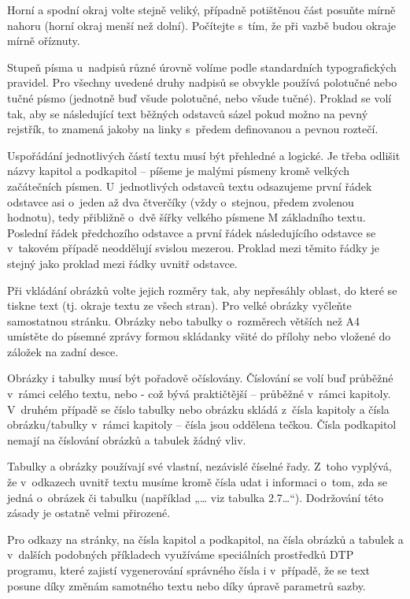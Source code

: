 \documentclass{template/socthesis}
\begin{document}
Horní a spodní okraj volte stejně veliký, případně potištěnou část posuňte mírně nahoru (horní okraj menší než dolní).
Počítejte s~tím, že při vazbě budou okraje mírně oříznuty.

Stupeň písma u~nadpisů různé úrovně volíme podle standardních typografických pravidel.
Pro všechny uvedené druhy nadpisů se obvykle používá polotučné nebo tučné písmo (jednotně buď všude polotučné, nebo všude tučné).
Proklad se volí tak, aby se následující text běžných odstavců sázel pokud možno na pevný rejstřík, to znamená jakoby na linky s~předem definovanou a pevnou roztečí.

Uspořádání jednotlivých částí textu musí být přehledné a logické.
Je třeba odlišit názvy kapitol a podkapitol – píšeme je malými písmeny kromě velkých začátečních písmen.
U~jednotlivých odstavců textu odsazujeme první řádek odstavce asi o~jeden až dva čtverčíky (vždy o~stejnou, předem zvolenou hodnotu), tedy přibližně o~dvě šířky velkého písmene M základního textu.
Poslední řádek předchozího odstavce a první řádek následujícího odstavce se v~takovém případě neoddělují svislou mezerou.
Proklad mezi těmito řádky je stejný jako proklad mezi řádky uvnitř odstavce.

Při vkládání obrázků volte jejich rozměry tak, aby nepřesáhly oblast, do které se tiskne text (tj.
okraje textu ze všech stran).
Pro velké obrázky vyčleňte samostatnou stránku.
Obrázky nebo tabulky o~rozměrech větších než A4 umístěte do písemné zprávy formou skládanky všité do přílohy nebo vložené do záložek na zadní desce.

Obrázky i tabulky musí být pořadově očíslovány.
Číslování se volí buď průběžné v~rámci celého textu, nebo - což bývá praktičtější – průběžné v~rámci kapitoly.
V~druhém případě se číslo tabulky nebo obrázku skládá z~čísla kapitoly a čísla obrázku/tabulky v~rámci kapitoly – čísla jsou oddělena tečkou.
Čísla podkapitol nemají na číslování obrázků a tabulek žádný vliv.

Tabulky a obrázky používají své vlastní, nezávislé číselné řady.
Z~toho vyplývá, že v~odkazech uvnitř textu musíme kromě čísla udat i informaci o~tom, zda se jedná o~obrázek či tabulku (například „… viz tabulka 2.7…“).
Dodržování této zásady je ostatně velmi přirozené.

Pro odkazy na stránky, na čísla kapitol a podkapitol, na čísla obrázků a tabulek a v~dalších podobných příkladech využíváme speciálních prostředků DTP programu, které zajistí vygenerování správného čísla i v~případě, že se text posune díky změnám samotného textu nebo díky úpravě parametrů sazby.
\end{document}
